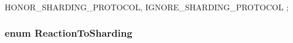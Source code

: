 \begin{DoxyCode}
                          {
    HONOR_SHARDING_PROTOCOL,
    IGNORE_SHARDING_PROTOCOL
  };
\end{DoxyCode}
\hypertarget{classtesting_1_1internal_1_1UnitTestImpl_ac8d671a300e2bd293e21f8ad1612543c}{
\subsubsection[{\-Reaction\-To\-Sharding}]{\setlength{\rightskip}{0pt plus 5cm}enum {\bf \-Reaction\-To\-Sharding}}}\label{d0/de3/classtesting_1_1internal_1_1UnitTestImpl_ac8d671a300e2bd293e21f8ad1612543c}
